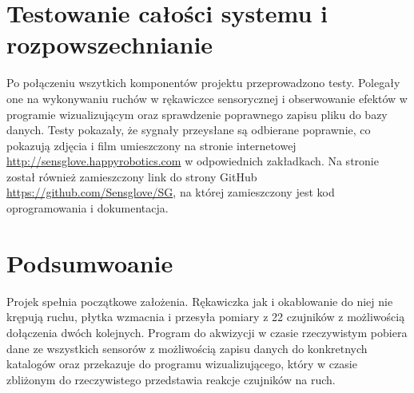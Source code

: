 \documentclass{article}
\begin{document}
\section{Testowanie całości systemu i rozpowszechnianie}
Po połączeniu wszytkich komponentów projektu przeprowadzono testy. Polegały one na wykonywaniu ruchów w rękawiczce sensorycznej i obserwowanie efektów w programie wizualizującym oraz sprawdzenie poprawnego zapisu pliku do bazy danych. Testy pokazały, że sygnały przeysłane są odbierane poprawnie, co pokazują zdjęcia i film umieszczony na stronie internetowej  \url{http://sensglove.happyrobotics.com} w odpowiednich zakładkach. Na stronie został również zamieszczony link do strony GitHub \url{https://github.com/Sensglove/SG}, na której zamieszczony jest kod oprogramowania i dokumentacja.

\section{Podsumwoanie}
Projek spełnia początkowe założenia. Rękawiczka jak i okablowanie do niej nie krępują ruchu, płytka wzmacnia i przesyła pomiary z 22 czujników z możliwością dołączenia dwóch kolejnych. Program do akwizycji w czasie rzeczywistym pobiera dane ze wszystkich sensorów z możliwością zapisu danych do konkretnych katalogów oraz przekazuje do programu wizualizującego, który w czasie zbliżonym do rzeczywistego przedstawia reakcje czujników na ruch.
\end{document}
